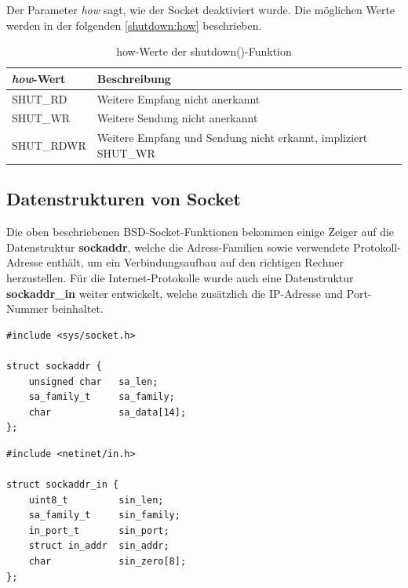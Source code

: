 Der Parameter \textit{how} sagt, wie der Socket deaktiviert wurde. Die möglichen Werte werden in der folgenden \autoref{shutdown:how} beschrieben. \smallskip \smallskip

\begin{table}[htbp]
	\centering
	\begin{tabular}{|l|l|}\hline
	   \textit{how}-Wert & Beschreibung \\ \hline \hline
	   SHUT\_RD & Weitere Empfang nicht anerkannt \\ \hline
	   SHUT\_WR & Weitere Sendung nicht anerkannt \\ \hline
	   SHUT\_RDWR & Weitere Empfang und Sendung nicht erkannt, impliziert SHUT\_WR \\ \hline
	 \end{tabular}
	 \caption[how-Werte der shutdown()-Funktion]{how-Werte der shutdown()-Funktion}\label{shutdown:how}
\end{table}

\subsection{Datenstrukturen von Socket}\label{sec:datenstrukturen}

Die oben beschriebenen BSD-Socket-Funktionen bekommen einige Zeiger auf die Datenstruktur \textbf{sockaddr}, welche die Adress-Familien sowie verwendete Protokoll-Adresse enthält, um ein Verbindungsaufbau auf den richtigen Rechner herzustellen. Für die Internet-Protokolle wurde auch eine Datenstruktur \textbf{sockaddr\_in} weiter entwickelt, welche zusätzlich die IP-Adresse und Port-Nummer beinhaltet. \smallskip \smallskip

\begin{verbatim}
#include <sys/socket.h>

struct sockaddr {
	unsigned char   sa_len;
	sa_family_t     sa_family;
	char            sa_data[14];
};
\end{verbatim}
\smallskip \smallskip

\begin{verbatim}
#include <netinet/in.h>

struct sockaddr_in {
	uint8_t         sin_len;
	sa_family_t     sin_family;
	in_port_t       sin_port;
	struct in_addr  sin_addr;
	char            sin_zero[8];
};
\end{verbatim}
\smallskip \smallskip

